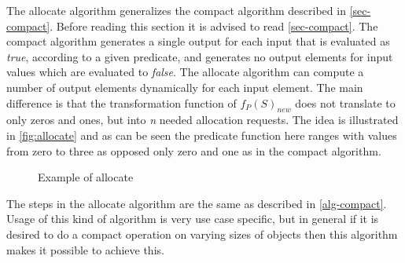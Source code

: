 The allocate algorithm generalizes the compact algorithm described in \autoref{sec-compact}.
Before reading this section it is advised to read \autoref{sec-compact}.
The compact algorithm generates a single output for each input that is evaluated as \textit{true}, according to a given predicate, and generates no output elements for input values which are evaluated to \textit{false}.
The allocate algorithm can compute a number of output elements dynamically for each input element.
The main difference is that the transformation function of $f_{P}(S)_{new}$ does not translate to only zeros and ones, but into \textit{n} needed allocation requests.
The idea is illustrated in \autoref{fig:allocate} and as can be seen the predicate function here ranges with values from zero to three as opposed only zero and one as in the compact algorithm.
\begin{figure}[ht]
	\centering
	\caption{Example of allocate}
	\label{fig:allocate}
\end{figure}
The steps in the allocate algorithm are the same as described in \autoref{alg-compact}.
Usage of this kind of algorithm is very use case specific, but in general if it is desired to do a compact operation on varying sizes of objects then this algorithm makes it possible to achieve this.